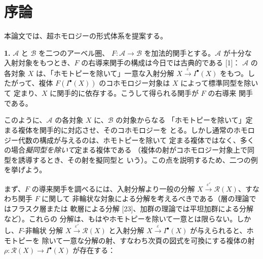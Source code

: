 \chapter*{序論}

本論文では、超ホモロジーの形式体系を提案する。

\noindent\textbf{1.}\quad
$\mathcal A$ と $\mathcal B$ を二つのアーベル圏、
$F:\mathcal A\to\mathcal B$ を加法的関手とする。$\mathcal A$ が十分な
入射対象をもつとき、$F$ の右導来関手の構成は今日では古典的である [1]：
$\mathcal A$ の各対象 $X$ は、「ホモトピーを除いて」一意な入射分解
$X\xrightarrow{\varepsilon}I^{\bullet}(X)$ をもつ。したがって、複体
$F(I^{\bullet}(X))$ のコホモロジー対象は $X$ によって標準同型を除いて
定まり、$X$ に関手的に依存する。こうして得られる関手が $F$ の右導来
関手である。

このように、$\mathcal A$ の各対象 $X$ に、$\mathcal B$ の対象からなる
「ホモトピーを除いて」定まる複体を関手的に対応させ、そのコホモロジーを
とる。しかし通常のホモロジー代数の構成が与えるのは、ホモトピーを除いて
定まる複体ではなく、多くの場合\emph{擬同型を除いて}定まる複体である
（複体の射がコホモロジー対象上で同型を誘導するとき、その射を擬同型と
いう）。この点を説明するため、二つの例を挙げよう。

まず、$F$ の導来関手を調べるには、入射分解より一般の分解
$X\xrightarrow{\varepsilon'}\mathcal R(X)$、すなわち関手 $F$ に関して
非輪状な対象による分解を考えるべきである（層の理論ではフラスク層または
軟層による分解 [23]、加群の理論では平坦加群による分解など）。これらの
分解は、もはやホモトピーを除いて一意とは限らない。しかし、$F$-非輪状
分解 $X\xrightarrow{\varepsilon'}\mathcal R(X)$ と入射分解
$X\xrightarrow{\varepsilon}I^{\bullet}(X)$ が与えられると、ホモトピーを
除いて一意な分解の射、すなわち次頁の図式を可換にする複体の射
$\rho:\mathcal R(X)\to I^{\bullet}(X)$ が存在する：
